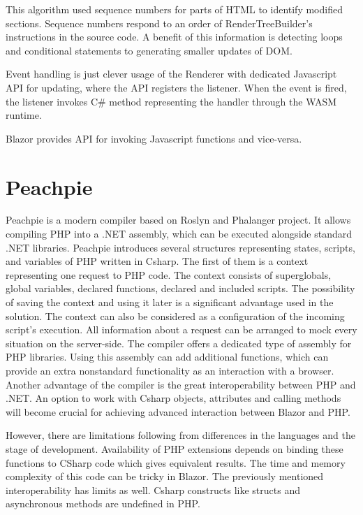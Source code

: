 This algorithm used sequence numbers for parts of HTML to identify modified sections.
Sequence numbers respond to an order of RenderTreeBuilder's instructions in the source code.
A benefit of this information is detecting loops and conditional statements to generating smaller updates of DOM.  
\par
Event handling is just clever usage of the Renderer with dedicated Javascript API for updating, where the API registers the listener.
When the event is fired, the listener invokes C\# method representing the handler through the WASM runtime.
\par
Blazor provides API for invoking Javascript functions and vice-versa.
\par

\section{Peachpie}

Peachpie  is a modern compiler based on Roslyn and Phalanger project.
It allows compiling PHP into a .NET assembly, which can be executed alongside standard .NET libraries.
Peachpie introduces several structures representing states, scripts, and variables of PHP written in Csharp.
The first of them is a context representing one request to PHP code.
The context consists of superglobals, global variables, declared functions, declared and included scripts.
The possibility of saving the context and using it later is a significant advantage used in the solution.
The context can also be considered as a configuration of the incoming script's execution.
All information about a request can be arranged to mock every situation on the server-side.
The compiler offers a dedicated type of assembly for PHP libraries.
Using this assembly can add additional functions, which can provide an extra nonstandard functionality as an interaction with a browser.
Another advantage of the compiler is the great interoperability between PHP and .NET.
An option to work with Csharp objects, attributes and calling methods will become crucial for achieving advanced interaction between Blazor and PHP.


However, there are limitations following from differences in the languages and the stage of development.
Availability of PHP extensions depends on binding these functions to CSharp code which gives equivalent results. The time and memory complexity of this code can be tricky in Blazor.
The previously mentioned interoperability has limits as well.
Csharp constructs like structs and asynchronous methods are undefined in PHP.


